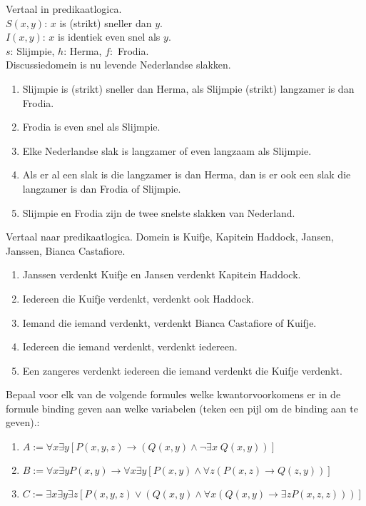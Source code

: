 \begin{exercise}
Vertaal in predikaatlogica.\\
$S(x,y)$: $x$ is (strikt) sneller dan $y$.\\
$I(x,y)$: $x$ is identiek even snel als $y$.\\
$s$: Slijmpie, $h$: Herma, $f:$ Frodia.\\
Discussiedomein is nu levende Nederlandse slakken.
\begin{enumerate}[label=\textit{\alph*.}]
    \item Slijmpie is (strikt) sneller dan Herma, als Slijmpie (strikt) langzamer is dan Frodia.
    \item Frodia is even snel als Slijmpie.
    \item Elke Nederlandse slak is langzamer of even langzaam als Slijmpie.
    \item Als er al een slak is die langzamer is dan Herma, dan is er ook een slak die langzamer is dan Frodia of Slijmpie.
    \item Slijmpie en Frodia zijn de twee snelste slakken van Nederland.
\end{enumerate}
\end{exercise}

\begin{exercise}
Vertaal naar predikaatlogica. Domein is Kuifje, Kapitein Haddock, Jansen, Janssen, Bianca Castafiore.
\begin{enumerate}[label=\textit{\alph*.}]
    \item Janssen verdenkt Kuifje en Jansen verdenkt Kapitein Haddock.
    \item Iedereen die Kuifje verdenkt, verdenkt ook Haddock.
    \item Iemand die iemand verdenkt, verdenkt Bianca Castafiore of Kuifje.
    \item Iedereen die iemand verdenkt, verdenkt iedereen.
    \item Een zangeres verdenkt iedereen die iemand verdenkt die Kuifje verdenkt.
\end{enumerate}
\end{exercise}

\begin{exercise}
Bepaal voor elk van de volgende formules welke kwantorvoorkomens er in de formule binding geven aan welke variabelen (teken een pijl om de binding aan te geven).:
\begin{enumerate}
    \item $A:=\forall x\exists y[P(x,y,z)\rightarrow(Q(x,y)\wedge\neg\exists x\;Q(x,y))]$\\
    \item $B:=\forall x\exists y P(x,y)\rightarrow \forall x\exists y[P(x,y)\wedge \forall z(P(x,z)\rightarrow Q(z,y))]$\\
    \item $C:= \exists x\exists y\exists z[P(x,y,z)\vee(Q(x,y)\wedge\forall x(Q(x,y)\rightarrow\exists z P(x,z,z)))]$
\end{enumerate}
\end{exercise}

